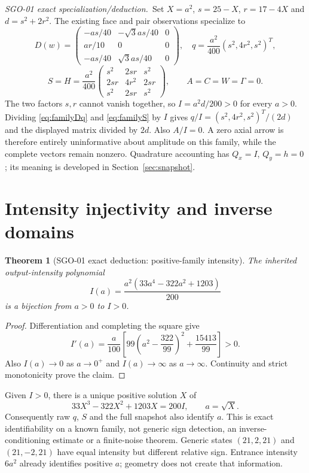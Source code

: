 \documentclass[11pt,a4paper]{article}
\newtheorem{theorem}[proposition]{Theorem}
\newcommand{\deduction}{\textit{SGO-01 exact specialization/deduction.}}
\begin{document}
\deduction\ Set $X=a^2$, $s=25-X$, $r=17-4X$ and $d=s^2+2r^2$. The existing face and pair observations specialize to
\begin{equation}
D(w)=\begin{pmatrix}-as/40&-\sqrt3as/40&0\\ar/10&0&0\\-as/40&\sqrt3as/40&0\end{pmatrix},
\quad q=\frac{a^2}{400}(s^2,4r^2,s^2)^T,\label{eq:familyDq}
\end{equation}
\begin{equation}
S=H=\frac{a^2}{400}
\begin{pmatrix}s^2&2sr&s^2\\2sr&4r^2&2sr\\s^2&2sr&s^2\end{pmatrix},
\qquad A=C=W=\Gamma=0.\label{eq:familyS}
\end{equation}
The two factors $s,r$ cannot vanish together, so $I=a^2d/200>0$ for every $a>0$. Dividing \eqref{eq:familyDq} and \eqref{eq:familyS} by $I$ gives $q/I=(s^2,4r^2,s^2)^T/(2d)$ and the displayed matrix divided by $2d$. Also $A/I=0$. A zero axial arrow is therefore entirely uninformative about amplitude on this family, while the complete vectors remain nonzero. Quadrature accounting has $Q_x=I$, $Q_y=h=0$; its meaning is developed in Section~\ref{sec:snapshot}.

\clearpage
\section{Intensity injectivity and inverse domains}\label{sec:intensity}
\begin{theorem}[SGO-01 exact deduction: positive-family intensity]
The inherited output-intensity polynomial
\begin{equation}
I(a)=\frac{a^2(33a^4-322a^2+1203)}{200}\label{eq:intensity}
\end{equation}
is a bijection from $a>0$ to $I>0$.
\end{theorem}
\begin{proof}
Differentiation and completing the square give
\begin{equation}
I'(a)=\frac a{100}\left[99\left(a^2-\frac{322}{99}\right)^2+\frac{15413}{99}\right]>0.\label{eq:derivative}
\end{equation}
Also $I(a)\to0$ as $a\to0^+$ and $I(a)\to\infty$ as $a\to\infty$. Continuity and strict monotonicity prove the claim.
\end{proof}
Given $I>0$, there is a unique positive solution $X$ of
\begin{equation}
33X^3-322X^2+1203X=200I,\qquad a=\sqrt X.\label{eq:cubicinverse}
\end{equation}
Consequently raw $q$, $S$ and the full snapshot also identify $a$. This is exact identifiability on a known family, not generic sign detection, an inverse-conditioning estimate or a finite-noise theorem. Generic states $(21,2,21)$ and $(21,-2,21)$ have equal intensity but different relative sign. Entrance intensity $6a^2$ already identifies positive $a$; geometry does not create that information.
\end{document}
